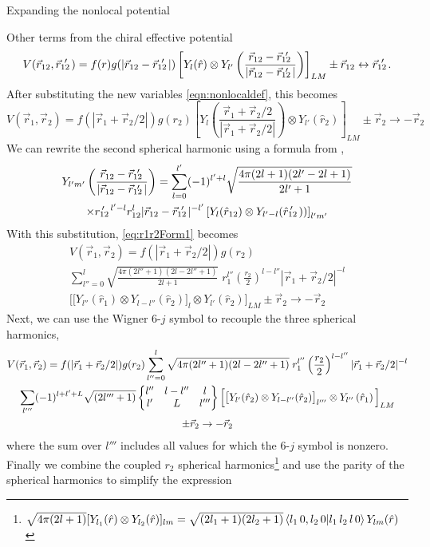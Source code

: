 \begin{section}{Expanding the nonlocal potential}
\begin{subsection}{Other terms from the chiral effective potential}
\begin{equation}
V(\rot,\rotp)=f(r)g(|\rot-\rotp |) \left[Y_{l}(\hat{r})\otimes Y_{l'}\left(\frac{\rot-\rotp}{|\rot-\rotp |}\right)\right]_{L M}\pm \rot\leftrightarrow \rotp.
\end{equation}
After substituting the new variables \eqref{eqn:nonlocaldef}, this becomes
\begin{equation}\label{eq:r1r2Form1}
V(\vec{r}_1,\vec{r}_2)=f(|\vec{r}_1+\vec{r}_2/2|)g(r_2) \left[Y_{l}\left(\frac{\vec{r}_1+\vec{r}_2/2}{|\vec{r}_1+\vec{r}_2/2|}\right)\otimes Y_{l'}\left(\hat{r}_2\right)\right]_{L M} \pm \vec{r}_2\rightarrow -\vec{r}_2
\end{equation} 
We can rewrite the second spherical harmonic using a formula from \cite{varshalovich1988},
\begin{multline}
Y_{l'm'}\left(\frac{\rot-\rotp}{|\rot-\rotp |}\right) = \sum_{l=0}^{l'}(-1)^{l'+l}\sqrt{\frac{4\pi(2l+1)(2l'-2l+1)}{2l'+1}} \\
\times \rotpr^{l'-l} r_{12}^l |\rot-\rotp|^{-l'}\left[Y_{l}(\hat{r}_{12})\otimes Y_{l'-l}(\rotphat))\right]_{l'm'}
\end{multline}
With this substitution, \eqref{eq:r1r2Form1} becomes
\begin{multline}
V(\vec{r}_1,\vec{r}_2)=f(|\vec{r}_1+\vec{r}_2/2|)g(r_2) \\
\sum_{l''=0}^{l} \sqrt{\frac{4\pi(2l''+1)(2l-2l''+1)}{2l+1}} \;r_1^{l''} \left(\frac{r_2}{2}\right)^{l-l''}|\vec{r}_1+\vec{r}_2/2|^{-l} \\
 \Big[\big[Y_{l''}(\hat{r}_1) \otimes Y_{l-l''}(\hat{r}_2) \big]_l \otimes Y_{l'}\left(\hat{r}_2\right)\Big]_{L M} \pm \vec{r}_2 \rightarrow -\vec{r}_2
\end{multline}
Next, we can use the Wigner 6-$j$ symbol to recouple the three spherical harmonics, 
\begin{multline}
V(\vec{r}_1,\vec{r}_2)=f(|\vec{r}_1+\vec{r}_2/2|)g(r_2) 
\sum_{l''=0}^{l} \sqrt{4\pi(2l''+1)(2l-2l''+1)} \;r_1^{l''} \left(\frac{r_2}{2}\right)^{l-l''}|\vec{r}_1+\vec{r}_2/2|^{-l} \\
\sum_{l'''} (-1)^{l+l'+L} \sqrt{(2l'''+1)} \begin{Bmatrix} l'' & l-l'' & l \\ l' & L & l''' \end{Bmatrix} \Big[\big[Y_{l'}(\hat{r}_2) \otimes Y_{l-l''}(\hat{r}_2) \big]_{l'''} \otimes Y_{l''}\left(\hat{r}_1\right)\Big]_{L M} \\
\pm \vec{r}_2 \rightarrow -\vec{r}_2
\end{multline}
where the sum over $l'''$ includes all values for which the 6-$j$ symbol is nonzero. Finally we combine the coupled $r_2$ spherical harmonics\footnote{$\sqrt{4\pi(2l+1)}[Y_{l_1}(\hat{r})\otimes Y_{l_2}(\hat{r})]_{lm}=\sqrt{(2l_1+1)(2l_2+1)}\braket{l_1\,0,l_2\,0|l_1\,l_2\,l\,0}Y_{lm}(\hat{r})$} and use the parity of the spherical harmonics to simplify the expression 

\end{subsection}
\end{section}
